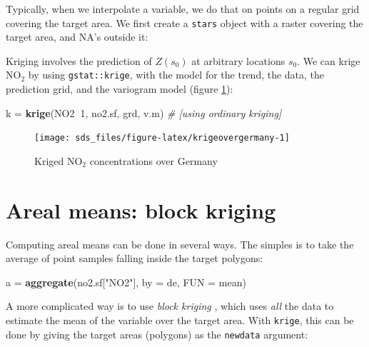 \documentclass[]{book}
\newenvironment{Shaded}{\begin{snugshade}}{\end{snugshade}}
\newcommand{\CommentTok}[1]{\textcolor[rgb]{0.56,0.35,0.01}{\textit{#1}}}
\newcommand{\DataTypeTok}[1]{\textcolor[rgb]{0.13,0.29,0.53}{#1}}
\newcommand{\DecValTok}[1]{\textcolor[rgb]{0.00,0.00,0.81}{#1}}
\newcommand{\KeywordTok}[1]{\textcolor[rgb]{0.13,0.29,0.53}{\textbf{#1}}}
\newcommand{\NormalTok}[1]{#1}
\newcommand{\OperatorTok}[1]{\textcolor[rgb]{0.81,0.36,0.00}{\textbf{#1}}}
\newcommand{\StringTok}[1]{\textcolor[rgb]{0.31,0.60,0.02}{#1}}
\begin{document}
Typically, when we interpolate a variable, we do that on
points on a regular grid covering the target area. We first create
a \texttt{stars} object with a raster covering the target area, and NA's
outside it:

Kriging involves the prediction of \(Z(s_0)\) at arbitrary locations
\(s_0\). We can krige NO\(_2\) by using \texttt{gstat::krige}, with the model for the
trend, the data, the prediction grid, and the variogram model (figure \ref{fig:krigeovergermany}):

\begin{Shaded}
\begin{Highlighting}[]
\NormalTok{k =}\StringTok{ }\KeywordTok{krige}\NormalTok{(NO2}\OperatorTok{~}\DecValTok{1}\NormalTok{, no2.sf, grd, v.m)}
\CommentTok{# [using ordinary kriging]}
\end{Highlighting}
\end{Shaded}



\begin{figure}

{\centering \texttt{[image: sds\_files/figure-latex/krigeovergermany-1]} 

}

\caption{Kriged NO\(_2\) concentrations over Germany}\label{fig:krigeovergermany}
\end{figure}

\hypertarget{blockkriging}{%
\section{Areal means: block kriging}\label{blockkriging}}

Computing areal means can be done in several ways. The simples is to take
the average of point samples falling inside the target polygons:

\begin{Shaded}
\begin{Highlighting}[]
\NormalTok{a =}\StringTok{ }\KeywordTok{aggregate}\NormalTok{(no2.sf[}\StringTok{"NO2"}\NormalTok{], }\DataTypeTok{by =}\NormalTok{ de, }\DataTypeTok{FUN =}\NormalTok{ mean)}
\end{Highlighting}
\end{Shaded}

A more complicated way is to use \emph{block kriging} \citep{jh78}, which
uses \emph{all} the data to estimate the mean of the variable over the
target area. With \texttt{krige}, this can be done by giving the target
areas (polygons) as the \texttt{newdata} argument:
\end{document}
